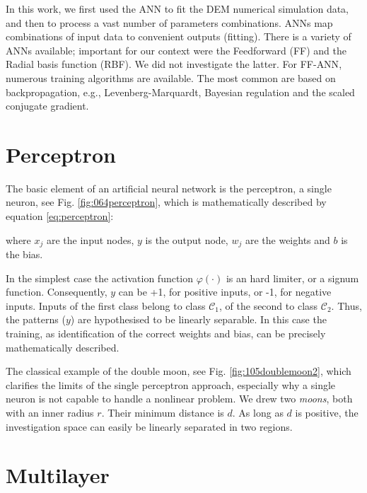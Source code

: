 

In this work, we first used the \acs{ANN} to fit the \acs{DEM} numerical simulation
data, and then to process a vast number of parameters combinations. 
\acs{ANNs} map combinations of input data to convenient outputs (fitting). 
There is a variety of \acs{ANNs} available; important for our context were the
Feedforward (\acs{FF}) and the Radial basis function (\acs{RBF}). 
We did not investigate the latter.
For \acs{FF}-\acs{ANN},
numerous training algorithms are available. The most common are based on
backpropagation, e.g., Levenberg-Marquardt, Bayesian regulation and the scaled
conjugate gradient.

\section{Perceptron}
\label{sec:perceptron}

The basic element of an artificial neural network is the perceptron, a single
neuron, see Fig.
\ref{fig:064perceptron}, which is mathematically described by equation
\ref{eq:perceptron}: 

where $x_j$ are the input nodes, $y$ is the output node, $w_j$ are the weights
and $b$ is the bias.

In the simplest case  the activation function $\varphi(\cdot)$ is an hard
limiter, or a signum function.
Consequently, $y$ can be +1, for positive inputs, or -1, for negative inputs. Inputs of the first class
belong to class $\mathscr{C}_1$, of the second to class $\mathscr{C}_2$.
Thus, the patterns ($y$) are hypothesised to be linearly separable.
In this case the training, as identification of the correct weights and bias,
can be precisely mathematically described.

The classical example of the double moon, see Fig. \ref{fig:105doublemoon2},
which clarifies the limits of the single perceptron approach, especially 
why a single neuron is not capable to handle a
nonlinear problem.
We drew two \textit{moons}, both with an inner radius $r$. Their minimum
distance is $d$.
As long as $d$ is positive, the investigation space
can easily be linearly separated in two regions.

\section{Multilayer}
\label{sec:multilayer}

